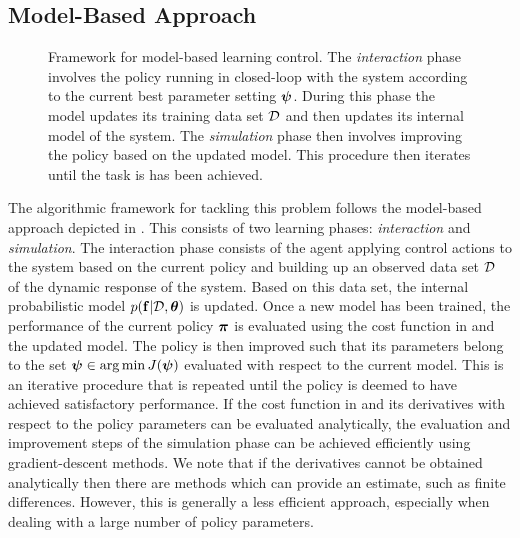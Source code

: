 \subsection{Model-Based Approach} \label{sec:modelbased}

\begin{figure}[t]
\centering
{}
\caption{Framework for model-based learning control. The \textit{interaction} phase involves the policy running in closed-loop with the system according to the current best parameter setting $\boldsymbol{\psi}$. During this phase the model updates its training data set $\mathcal{D}$ and then updates its internal model of the system. The \textit{simulation} phase then involves improving the policy based on the updated model. This procedure then iterates until the task is has been achieved. }
\label{fig:pilcoframework}
\end{figure}

The algorithmic framework for tackling this problem follows the model-based approach depicted in . This consists of two learning phases: \textit{interaction} and \textit{simulation}. The interaction phase consists of the agent applying control actions to the system based on the current policy and building up an observed data set $\mathcal{D}$ of the dynamic response of the system. Based on this data set, the internal probabilistic model $p(\mathbf{f}|\mathcal{D},\boldsymbol{\theta})$ is updated. Once a new model has been trained, the performance of the current policy $\boldsymbol{\pi}$ is evaluated using the cost function in  and the updated model. The policy is then improved such that its parameters belong to the set $\boldsymbol{\psi} \in \arg\min J(\boldsymbol{\psi})$ evaluated with respect to the current model. This is an iterative procedure that is repeated until the policy is deemed to have achieved satisfactory performance. If the cost function in  and its derivatives with respect to the policy parameters can be evaluated analytically, the evaluation and improvement steps of the simulation phase can be achieved efficiently using gradient-descent methods. We note that if the derivatives cannot be obtained analytically then there are methods which can provide an estimate, such as finite differences. However, this is generally a less efficient approach, especially when dealing with a large number of policy parameters.



